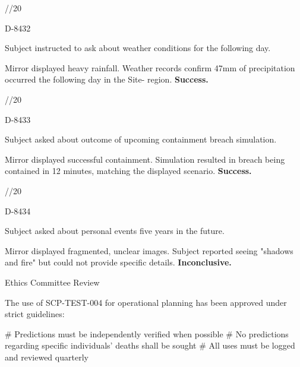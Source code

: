 \begin{scpdialogue}

 //20

 D-8432

 Subject instructed to ask about weather conditions for the following day.

 Mirror displayed heavy rainfall. Weather records confirm 47mm of precipitation occurred the following day in the Site- region. \textbf{Success.}

 //20

 D-8433

 Subject asked about outcome of upcoming containment breach simulation.

 Mirror displayed successful containment. Simulation resulted in breach being contained in 12 minutes, matching the displayed scenario. \textbf{Success.}

 //20

 D-8434

 Subject asked about personal events five years in the future.

 Mirror displayed fragmented, unclear images. Subject reported seeing "shadows and fire" but could not provide specific details. \textbf{Inconclusive.}

\end{scpdialogue}

\begin{scpquote}

\end{scpquote}




Ethics Committee Review

The use of SCP-TEST-004 for operational planning has been approved under strict guidelines:

\# Predictions must be independently verified when possible
\# No predictions regarding specific individuals' deaths shall be sought
\# All uses must be logged and reviewed quarterly



